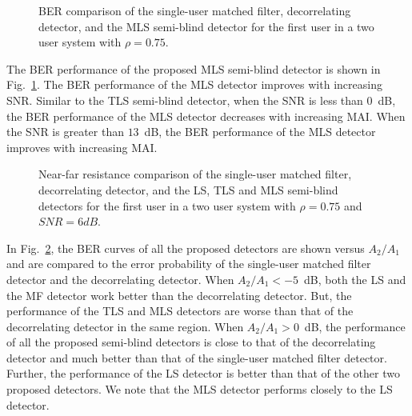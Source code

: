 \documentclass[10pt,fleqn,twocolumn]{IEEEtran}
\begin{document}
\begin{figure}
\caption{BER comparison of the single-user matched filter,
decorrelating detector, and the MLS semi-blind detector for the
first user in a two user system with $\rho=0.75$.} \label{BER_MLS}
\end{figure}
The BER performance of the proposed MLS semi-blind detector is shown in
Fig.~\ref{BER_MLS}.  The BER performance of the MLS detector improves
with increasing SNR.  Similar to the TLS semi-blind detector, when the SNR
is less than $0$~dB, the BER performance of the MLS detector decreases
with increasing MAI.  When the SNR is greater than $13$~dB, the BER
performance of the MLS detector improves with increasing MAI.

\begin{figure}
\caption{Near-far resistance comparison of the single-user matched
filter, decorrelating detector, and the LS, TLS and MLS semi-blind
detectors for the first user in a two user system with $\rho=0.75$
and $SNR=6dB$.} \label{NFR}
\end{figure}
In Fig.~\ref{NFR}, the BER curves of all the proposed detectors are shown
versus $A_2/A_1$ and are compared to the error probability of the
single-user matched filter detector and the decorrelating detector.
When $A_2/A_1<-5$~dB, both the LS and the MF detector work better than
the decorrelating detector.  But, the performance of the TLS and MLS
detectors are worse than that of the decorrelating detector in the same
region.  When $A_2/A_1>0$~dB, the performance of all the proposed
semi-blind detectors is close to that of the decorrelating detector and
much better than that of the single-user matched filter detector.
Further, the performance of the LS detector is better than that of the other
two proposed detectors.  We note that the MLS detector performs closely
to the LS detector.
\end{document}
